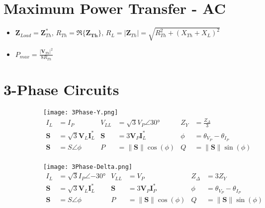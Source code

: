 \section*{Maximum Power Transfer - AC}
	\begin{itemize}[noitemsep, nolistsep]
		\item $\mathbf{Z}_{Load}=\mathbf{Z}_{Th}^*$, $R_{Th}=\Re\lbrace\mathbf{Z_{Th}}\rbrace$, $R_L= \lvert \mathbf{Z}_{Th} \rvert = \sqrt{R_{Th}^2+\left( X_{Th}+X_{L}\right)^2}$
		\item $P_{max}=\frac{\lvert\mathbf{V}_{Th}\rvert^2}{8R_{Th}}$
	\end{itemize}
	\vspace{-4.5mm}
\section*{3-Phase Circuits} \label{sec:3-Phase}
	\begin{figure} %
		\begin{subfigure}{0.5\textwidth} %
			\centering
			\texttt{[image: 3Phase-Y.png]}
			\label{subfig:3 Phase-Y}
			\begin{align*}
				I_{L} &= I_{P} &
				V_{LL} &= \sqrt{3} V_{P} \angle \ang{30} &
				Z_{Y} &= \frac{Z_{\Delta}}{3} \\
				\mathbf{S} &= \sqrt{3} \mathbf{V}_{L} \mathbf{I}_{L}^{*} &
				\mathbf{S} &= 3 \mathbf{V}_{P} \mathbf{I}_{L}^{*} &
				\phi &= \theta_{V_{P}} - \theta_{I_{P}} \\
				\mathbf{S} &= S \angle \phi &
				P &= \lVert \mathbf{S} \rVert \cos \left( \phi \right) &
				Q &= \lVert \mathbf{S} \rVert \sin \left( \phi \right) \\
			\end{align*}
		\end{subfigure}
		\vline
		\begin{subfigure}{0.5\textwidth} %
			\centering
			\texttt{[image: 3Phase-Delta.png]}
				\begin{align*}
					I_{L} &= \sqrt{3} I_{P} \angle \ang{-30} &
					V_{LL} &= V_{P} &
					Z_{\Delta} &= 3 Z_{Y} \\
					\mathbf{S} &= \sqrt{3} \mathbf{V}_{L} \mathbf{I}_{L}^{*} &
					\mathbf{S} &= 3 \mathbf{V}_{P} \mathbf{I}_{P}^{*} &
					\phi &= \theta_{V_{P}} - \theta_{I_{P}} \\
					\mathbf{S} &= S \angle \phi &
					P &= \lVert \mathbf{S} \rVert \cos \left( \phi \right) &
					Q &= \lVert \mathbf{S} \rVert \sin \left( \phi \right) \\
				\end{align*}
			\label{subfig:3 Phase-Delta}
		\end{subfigure}
	\end{figure}
